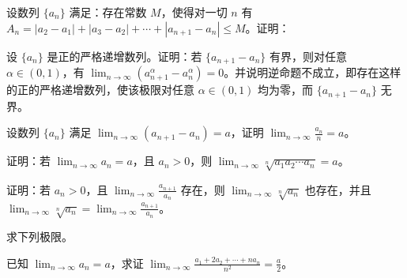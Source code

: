 \noindent\begin{minipage}{\textwidth}
设数列 $\{a_n\}$ 满足：存在常数 $M$，使得对一切 $n$ 有 $A_n=|a_2-a_1|+|a_3-a_2|+\cdots+|a_{n+1}-a_n|\le M$。证明：
\end{minipage}\par\vfill
\noindent\begin{minipage}{\textwidth}
设 $\{a_n\}$ 是正的严格递增数列。证明：若 $\{a_{n+1}-a_n\}$ 有界，则对任意 $\alpha\in(0,1)$，有 $\lim_{n\to\infty}(a_{n+1}^\alpha-a_n^\alpha)=0$。并说明逆命题不成立，即存在这样的正的严格递增数列，使该极限对任意 $\alpha\in(0,1)$ 均为零，而 $\{a_{n+1}-a_n\}$ 无界。
\end{minipage}\par\vfill
\newpage
\noindent\begin{minipage}{\textwidth}
设数列 $\{a_n\}$ 满足 $\lim_{n\to\infty}(a_{n+1}-a_n)=a$，证明 $\displaystyle\lim_{n\to\infty}\frac{a_n}{n}=a$。
\end{minipage}\par\vfill
\noindent\begin{minipage}{\textwidth}
证明：若 $\lim_{n\to\infty}a_n=a$，且 $a_n>0$，则 $\displaystyle\lim_{n\to\infty}\sqrt[n]{a_1a_2\cdots a_n}=a$。
\end{minipage}\par\vfill
\noindent\begin{minipage}{\textwidth}
证明：若 $a_n>0$，且 $\displaystyle\lim_{n\to\infty}\frac{a_{n+1}}{a_n}$ 存在，则 $\displaystyle\lim_{n\to\infty}\sqrt[n]{a_n}$ 也存在，并且 $\displaystyle\lim_{n\to\infty}\sqrt[n]{a_n}=\lim_{n\to\infty}\frac{a_{n+1}}{a_n}$。
\end{minipage}\par\vfill
\noindent\begin{minipage}{\textwidth}
求下列极限。
\end{minipage}\par\vfill
\newpage
\noindent\begin{minipage}{\textwidth}
已知 $\lim_{n\to\infty}a_n=a$，求证 $\displaystyle\lim_{n\to\infty}\frac{a_1+2a_2+\cdots+na_n}{n^2}=\frac a2$。
\end{minipage}\par\vfill
